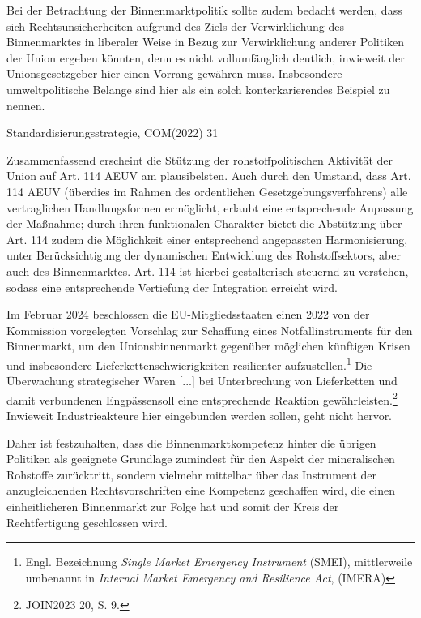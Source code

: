 \documentclass[12pt,a4paper,oneside]{book} %
\begin{document}
Bei der Betrachtung der Binnenmarktpolitik sollte zudem bedacht werden, dass sich Rechtsunsicherheiten aufgrund des Ziels der Verwirklichung des Binnenmarktes in liberaler Weise in Bezug zur Verwirklichung anderer Politiken der Union ergeben könnten, denn es nicht vollumfänglich deutlich, inwieweit der Unionsgesetzgeber hier einen Vorrang gewähren muss.\autocite[§23 Rn 10]{classen_europarecht_2021} Insbesondere umweltpolitische Belange sind hier als ein solch konterkarierendes Beispiel zu nennen.
	
	
Standardisierungsstrategie, COM(2022) 31
	
Zusammenfassend erscheint die Stützung der rohstoffpolitischen Aktivität der Union auf Art. 114 AEUV am plausibelsten. Auch durch den Umstand, dass Art. 114 AEUV (überdies im Rahmen des ordentlichen Gesetzgebungsverfahrens) alle vertraglichen Handlungsformen ermöglicht, erlaubt eine entsprechende Anpassung der Maßnahme; durch ihren funktionalen Charakter bietet die Abstützung über Art. 114 zudem die Möglichkeit einer entsprechend angepassten Harmonisierung, unter Berücksichtigung der dynamischen Entwicklung des Rohstoffsektors, aber auch des Binnenmarktes. Art. 114 ist hierbei gestalterisch-steuernd zu verstehen, sodass eine entsprechende Vertiefung der Integration erreicht wird.\autocite{Grabitz/Hilf/Nettesheim/Tietje AEUV Art. 114 Rn. 34}

Im Februar 2024 beschlossen die EU-Mitgliedsstaaten einen 2022 von der Kommission vorgelegten Vorschlag zur Schaffung eines \glqq Notfallinstruments für den Binnenmarkt\grqq, um den Unionsbinnenmarkt gegenüber möglichen künftigen Krisen und insbesondere Lieferkettenschwierigkeiten resilienter aufzustellen.\footnote{Engl. Bezeichnung \textit{Single Market Emergency Instrument} (SMEI), mittlerweile umbenannt in \textit{Internal Market Emergency and Resilience Act}, (IMERA)}
Die \glqq Überwachung strategischer Waren [...] bei Unterbrechung von Lieferketten und damit verbundenen Engpässen\grqq soll eine entsprechende Reaktion gewährleisten.\footnote{JOIN2023 20, S. 9.} Inwieweit Industrieakteure hier eingebunden werden sollen, geht nicht hervor.

Daher ist festzuhalten, dass die Binnenmarktkompetenz hinter die übrigen Politiken als geeignete Grundlage zumindest für den Aspekt der mineralischen Rohstoffe zurücktritt, sondern vielmehr mittelbar über das Instrument der anzugleichenden Rechtsvorschriften eine Kompetenz geschaffen wird, die einen einheitlicheren Binnenmarkt zur Folge hat und somit der Kreis der Rechtfertigung geschlossen wird.
\end{document}
